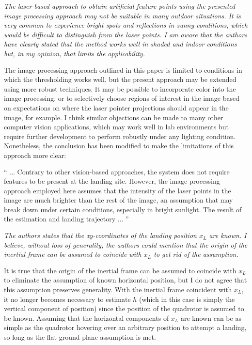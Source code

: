 \documentclass[11pt]{article}
\newenvironment{correction}{\begin{list}{}{\setlength{\leftmargin}{1cm}\setlength{\rightmargin}{1cm}}\vspace{\parsep}\item[]``}{''\end{list}}
\begin{document}
\setlength{\leftmargini}{0pt}
\begin{itemize}\setlength{\itemsep}{2\parsep}

\item 
\textit{The laser-based approach to obtain artificial feature points using the presented image processing approach may not be suitable in many outdoor situations. 
It is very common to experience bright spots and reflections in sunny conditions, which would be difficult to distinguish from the laser points. 
I am aware that the authors have clearly stated that the method works well in shaded and indoor conditions but, in my opinion, that limits the applicability.
}

The image processing approach outlined in this paper is limited to conditions in which the thresholding works well, but the present approach may be extended using more robust techniques. 
It may be possible to incorporate color into the image processing, or to selectively choose regions of interest in the image based on expectations on where the laser pointer projections should appear in the image, for example. 
I think similar objections can be made to many other computer vision applications, which may work well in lab environments but require further development to perform robustly under any lighting condition. 
Nonetheless, the conclusion has been modified to make the limitations of this approach more clear:

\begin{correction}
... Contrary to other vision-based approaches, the system does not require features to be present at the landing site. 
However, the image processing approach employed here assumes that the intensity of the laser points in the image are much brighter than the rest of the image, an assumption that may break down under certain conditions, especially in bright sunlight.
The result of the estimation and landing trajectory ...
\end{correction}

\item
\textit{The authors states that the xy-coordinates of the landing position $x_L$ are known. 
I believe, without loss of generality, the authors could mention that the origin of the inertial frame can be assumed to coincide with $x_L$ to get rid of the assumption.
}

It is true that the origin of the inertial frame can be assumed to coincide with $x_L$ to eliminate the assumption of known horizontal position, but I do not agree that this assumption preserves generality. 
With the inertial frame coincident with $x_L$, it no longer becomes necessary to estimate $h$ (which in this case is simply the vertical component of position) since the position of the quadrotor is assumed to be known.
Assuming that the horizontal components of $x_L$ are known can be as simple as the quadrotor hovering over an arbitrary position to attempt a landing, so long as the flat ground plane assumption is met.


\end{itemize}
\end{document}
